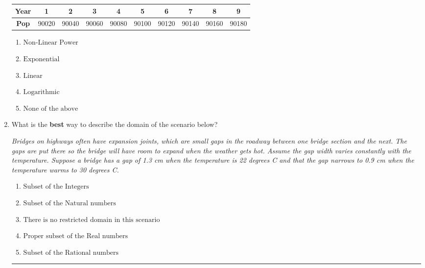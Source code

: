 \documentclass[14pt]{extbook}
\newcommand{\litem}[1]{\item#1\hspace*{-1cm}\rule{\textwidth}{0.4pt}}
\begin{document}
\begin{enumerate}
{\begin{tabular}{c|c|c|c|c|c|c|c|c|c}
\textbf{Year} &1 &2 &3 &4 &5 &6 &7 &8 &9\tabularnewline \hline
\textbf{Pop} &90020 &90040 &90060 &90080 &90100 &90120 &90140 &90160 &90180\end{tabular}\begin{enumerate}[label=\Alph*.]
\item \( \text{Non-Linear Power} \)
\item \( \text{Exponential} \)
\item \( \text{Linear} \)
\item \( \text{Logarithmic} \)
\item \( \text{None of the above} \)

\end{enumerate} }
\litem{
What is the \textbf{best} way to describe the domain of the scenario below?
\begin{center}
    \textit{ Bridges on highways often have expansion joints, which are small gaps in the roadway between one bridge section and the next. The gaps are put there so the bridge will have room to expand when the weather gets hot. Assume the gap width varies constantly with the temperature. Suppose a bridge has a gap of 1.3 cm when the temperature is 22 degrees C and that the gap narrows to 0.9 cm when the temperature warms to 30 degrees C. }
\end{center}
\begin{enumerate}[label=\Alph*.]
\item \( \text{Subset of the Integers} \)
\item \( \text{Subset of the Natural numbers} \)
\item \( \text{There is no restricted domain in this scenario} \)
\item \( \text{Proper subset of the Real numbers} \)
\item \( \text{Subset of the Rational numbers} \)

\end{enumerate} }
\end{enumerate}
\end{document}

